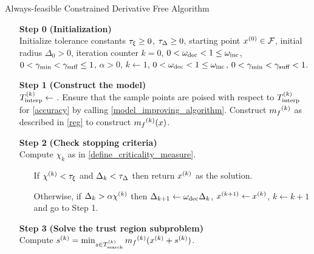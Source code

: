 \begin{algorithm}[H]
    \caption{Always-feasible Constrained Derivative Free Algorithm}
    \label{linearly_constrained_dfo}
    \begin{itemize}
        \item[\textbf{Step 0}] \textbf{(Initialization)} \\
            Initialize tolerance constants 
            $\tau_{\xi} \ge 0$,
            $\tau_{\Delta} \ge 0$,
            starting point $x^{(0)} \in {\mathcal F}$,
            initial radius $\Delta_0 > 0$,
            iteration counter $k=0$,
            $0 < \omega_{\text{dec}} < 1 \le \omega_{\text{inc}}$,
            $0 < \gamma_{\textrm{min}} < \gamma_{\textrm{suff}} \le 1$,
            $\alpha > 0$,
            $k \gets 1$,
            $0 < \omega_{\text{dec}} < 1 \le \omega_{\text{inc}}$,
            $0 < \gamma_{\textrm{min}} < \gamma_{\textrm{suff}} < 1$.
            
        \item[\textbf{Step 1}] \textbf{(Construct the model)} \\
            $ {T_{\text{interp}}^{(k)}} \gets $ .
            Ensure that the sample points are poised with respect to $ {T_{\text{interp}}^{(k)}} $ for \cref{accuracy} by calling \cref{model_improving_algorithm}.
            Construct ${{m}_f}^{(k)}$ as described in \cref{reg} to construct ${{m}_f}^{(k)}(x)$.
        
        \item[\textbf{Step 2}] \textbf{(Check stopping criteria)} \\
            Compute $\chi_k$ as in \cref{define_criticality_measure}. \begin{itemize}
                \item[] If $ {\chi^{(k)}} < \tau_{\xi} $ and $\Delta_k <\tau_{\Delta}$ then return $x^{(k)}$ as the solution.
                \item[] Otherwise, if $\Delta_k > \alpha {\chi^{(k)}}$ then 
                $\Delta_{k+1} \gets \omega_{\text{dec}}\Delta_k$, 
                $x^{(k+1)} \gets x^{(k)}$,
                $k \gets k+1$ and go to Step 1.
            \end{itemize}
        
        \item[\textbf{Step 3}] \textbf{(Solve the trust region subproblem)} \\
            Compute ${{s}^{(k)}} = \min_{s \in {T_{\text{search}}^{(k)}}} {{m}_f}^{(k)}(x^{(k)} + {{s}^{(k)}})$.
            

\end{itemize}
\end{algorithm}

